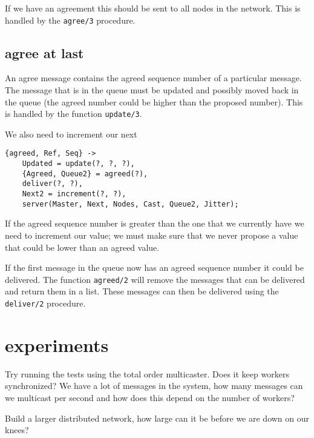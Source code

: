 \documentclass[a4paper,11pt]{article}
\begin{document}
If we have an agreement this should be sent to all nodes in the
network. This is handled by the {\tt agree/3} procedure.

\subsection{agree at last}

An agree message contains the agreed sequence number of a particular
message. The message that is in the queue must be updated and possibly
moved back in the queue (the agreed number could be higher than the
proposed number).  This is handled by the function {\tt update/3}.


We also need to increment our next 

\begin{verbatim}
{agreed, Ref, Seq} ->
    Updated = update(?, ?, ?),
    {Agreed, Queue2} = agreed(?),
    deliver(?, ?),
    Next2 = increment(?, ?),
    server(Master, Next, Nodes, Cast, Queue2, Jitter);
\end{verbatim}

If the agreed sequence number is greater than the one that we
currently have we need to increment our value; we must make sure that
we never propose a value that could be lower than an agreed value.

If the first message in the queue now has an agreed sequence number it
could be delivered. The function {\tt agreed/2} will remove the
messages that can be delivered and return them in a list. These
messages can then be delivered using the {\tt deliver/2} procedure.


\section{experiments}

Try running the tests using the total order multicaster. Does it keep
workers synchronized? We have a lot of messages in the system, how
many messages can we multicast per second and how does this depend on
the number of workers? 

Build a larger distributed network, how large can it be before we are
down on our knees?
\end{document}
